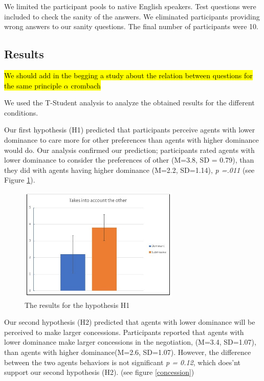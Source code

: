 \documentclass{llncs}
\begin{document}
		
		We limited the participant pools to native English speakers. Test questions were included to check the sanity of the answers. We eliminated participants providing wrong answers to our sanity questions. The final number of participants were 10. 
		
		\subsection{Results}
		\hl{We should add in the begging a study about the relation between questions for the same principle $\alpha$ crombach}
		
		
		\par We used the T-Student analysis to analyze the obtained results for the different conditions. 
		
		
		Our first hypothesis (H1) predicted that participants perceive agents with lower dominance  to care more for other preferences than agents with higher dominance would do. Our analysis confirmed our prediction; participants rated agents with lower dominance to consider the preferences of other (M=3.8, SD = 0.79), than they did with agents having higher dominance (M=2.2, SD=1.14), \emph{p =.011} (see Figure \ref{considerOther}).
					\begin{figure}[h]
						\centering
						\caption{\label{considerOther} The results for the  hypothesis H1}
						\includegraphics[width=3in]{plots/considerOther}
					\end{figure}
		
		\par Our second hypothesis (H2) predicted that agents with lower dominance will be perceived to make larger concessions. Participants reported that agents with lower dominance  make larger concessions in the negotiation, (M=3.4, SD=1.07), than agents with higher dominance(M=2.6, SD=1.07). However, the difference between the two agents behaviors is not significant \emph{p = 0.12}, which does'nt support our second hypothesis (H2). (see figure  \ref{concession})
		
\end{document}
